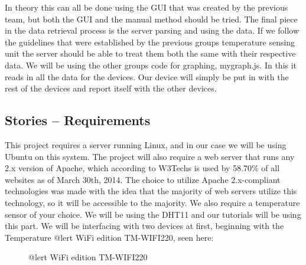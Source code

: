 \documentclass{report}
\begin{document}
In theory this can all be done using the GUI that was created by the previous team, but both the GUI and the manual method should be tried.
\newline
\indent
The final piece in the data retrieval process is the server parsing and using the data. 
If we follow the guidelines that were established by the previous groups temperature sensing unit the server should be able to treat them both the same with their respective data.
We will be using the other groups code for graphing, mygraph.js.
In this it reads in all the data for the devices. 
Our device will simply be put in with the rest of the devices and report itself with the other devices.
\newline
\indent
\newpage

\subsection*{Stories -- Requirements}
This project requires a server running Linux, and in our case we will be using Ubuntu on this system. 
The project will also require a web server that runs any 2.x version of Apache, which according to W3Techs is used by 58.70$\%$ of all websites as of March 30th, 2014.
The choice to utilize Apache 2.x-compliant technologies was made with the idea that the majority of web servers utilize this technology, so it will be accessible to the majority. 
We also require a temperature sensor of your choice.
We will be using the DHT11 and our tutorials will be using this part. 
We will be interfacing with two devices at first, beginning with the Temperature @lert WiFi edition TM-WIFI220, seen here:
\begin{figure}[H]
\caption{@lert WiFi edition TM-WIFI220}
\end{figure}
\end{document}
